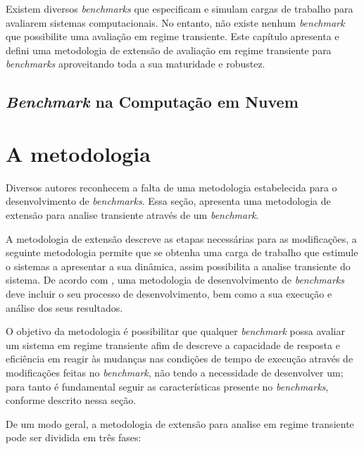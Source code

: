 
Existem diversos \textit{benchmarks} que especificam e simulam cargas de trabalho para avaliarem sistemas computacionais. No entanto, não existe nenhum \textit{benchmark} que possibilite uma avaliação em regime transiente. Este capítulo apresenta e defini uma metodologia de extensão de avaliação em regime transiente para \textit{benchmarks} aproveitando toda a sua maturidade e robustez.


\subsection{\textit{Benchmark} na Computação em Nuvem}
\label{sec-benchmark-web}

\section{A metodologia}
\label{sec-method}

Diversos autores \cite{Hinnant1988, Price1989, KaiSachs2010, Folkerts2013, Marco2012} reconhecem a falta de uma metodologia estabelecida para o desenvolvimento de \textit{benchmarks}. Essa seção, apresenta uma metodologia de extensão para analise transiente através de um \textit{benchmark}. 

A metodologia de extensão descreve as etapas necessárias para as modificações, a seguinte metodologia permite que se obtenha uma carga de trabalho que estimule o sistemas a apresentar a sua dinâmica, assim possibilita a analise transiente do sistema. De acordo com \cite{KaiSachs2010}, uma metodologia de desenvolvimento de \textit{benchmarks} deve incluir o seu processo de desenvolvimento, bem como a sua execução e análise dos seus resultados. 

O objetivo da metodologia é possibilitar que qualquer \textit{benchmark} possa avaliar um sistema em regime transiente afim de descreve a capacidade de resposta e eficiência em reagir às mudanças nas condições de tempo de execução através de modificações feitas no \textit{benchmark}, não tendo a necessidade de desenvolver um; para tanto é fundamental seguir as características presente no \textit{benchmarks}, conforme descrito nessa seção.

De um modo geral, a metodologia de extensão para analise em regime transiente pode ser dividida em três fases:

